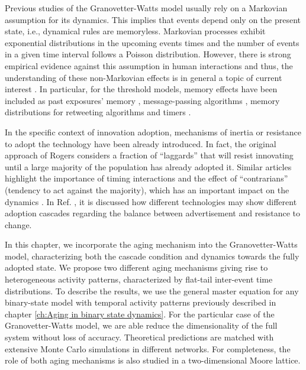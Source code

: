 Previous studies of the Granovetter-Watts model usually rely on a Markovian assumption for its dynamics. This implies that events depend only on the present state, i.e., dynamical rules are memoryless. Markovian processes exhibit exponential distributions in the upcoming events times and the number of events in a given time interval follows a Poisson distribution. However, there is strong empirical evidence against this assumption in human interactions and thus, the understanding of these non-Markovian effects is in general a topic of current interest \cite{van-mieghem-2013,starnini-2017,peralta-2020C,peralta-2020A}. In particular, for the threshold models, memory effects have been included as past exposures' memory \cite{dodds-2004}, message-passing algorithms \cite{shrestha-2014}, memory distributions for retweeting algorithms \cite{gleeson-2016} and timers \cite{oh-2018}.

In the specific context of innovation adoption, mechanisms of inertia or resistance to adopt the technology have been already introduced. In fact, the original approach of Rogers \cite{rogers2014} considers a fraction of ``laggards'' that will resist innovating until a large majority of the population has already adopted it. Similar articles highlight the importance of timing interactions \cite{bass1969} and the effect of ``contrarians'' (tendency to act against the majority), which has an important impact on the dynamics \cite{galam-2008,goncalves-2012}. In Ref. \cite{goncalves-2012}, it is discussed how different technologies may show different adoption cascades regarding the balance between advertisement and resistance to change.

In this chapter, we incorporate the aging mechanism into the Granovetter-Watts model, characterizing both the cascade condition and dynamics towards the fully adopted state. We propose two different aging mechanisms giving rise to heterogeneous activity patterns, characterized by flat-tail inter-event time distributions. To describe the results, we use the general master equation for any binary-state model with temporal activity patterns previously described in chapter \ref{ch:Aging in binary state dynamics}. For the particular case of the Granovetter-Watts model, we are able reduce the dimensionality of the full system without loss of accuracy. Theoretical predictions are matched with extensive Monte Carlo simulations in different networks. For completeness, the role of both aging mechanisms is also studied in a two-dimensional Moore lattice.

